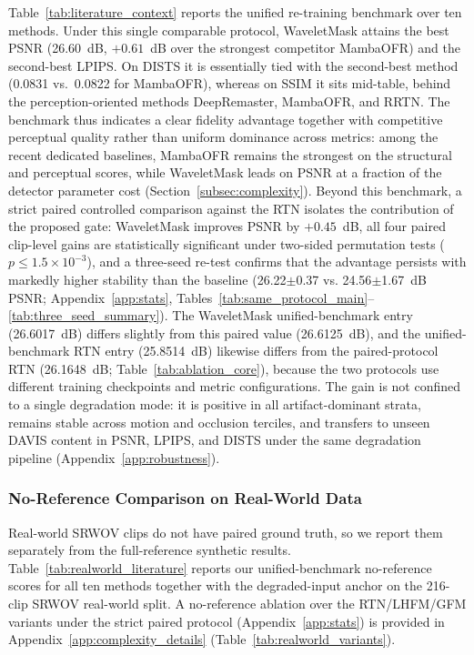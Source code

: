 \documentclass[applsci,article,submit,pdftex,moreauthors]{Definitions/mdpi}
\begin{document}
Table~\ref{tab:literature_context} reports the unified re-training benchmark over ten methods. Under this single comparable protocol, WaveletMask attains the best PSNR (26.60~dB, $+0.61$~dB over the strongest competitor MambaOFR) and the second-best LPIPS. On DISTS it is essentially tied with the second-best method (0.0831 vs.\ 0.0822 for MambaOFR), whereas on SSIM it sits mid-table, behind the perception-oriented methods DeepRemaster, MambaOFR, and RRTN. The benchmark thus indicates a clear fidelity advantage together with competitive perceptual quality rather than uniform dominance across metrics: among the recent dedicated baselines, MambaOFR remains the strongest on the structural and perceptual scores, while WaveletMask leads on PSNR at a fraction of the detector parameter cost (Section~\ref{subsec:complexity}). Beyond this benchmark, a strict paired controlled comparison against the RTN isolates the contribution of the proposed gate: WaveletMask improves PSNR by $+0.45$~dB, all four paired clip-level gains are statistically significant under two-sided permutation tests ($p\le1.5\times10^{-3}$), and a three-seed re-test confirms that the advantage persists with markedly higher stability than the baseline (26.22$\pm$0.37 vs. 24.56$\pm$1.67~dB PSNR; Appendix~\ref{app:stats}, Tables~\ref{tab:same_protocol_main}--\ref{tab:three_seed_summary}). The WaveletMask unified-benchmark entry (26.6017~dB) differs slightly from this paired value (26.6125~dB), and the unified-benchmark RTN entry (25.8514~dB) likewise differs from the paired-protocol RTN (26.1648~dB; Table~\ref{tab:ablation_core}), because the two protocols use different training checkpoints and metric configurations. The gain is not confined to a single degradation mode: it is positive in all artifact-dominant strata, remains stable across motion and occlusion terciles, and transfers to unseen DAVIS content in PSNR, LPIPS, and DISTS under the same degradation pipeline (Appendix~\ref{app:robustness}).

\subsubsection{No-Reference Comparison on Real-World Data}\label{subsec:realworld}

Real-world SRWOV clips do not have paired ground truth, so we report them separately from the full-reference synthetic results. Table~\ref{tab:realworld_literature} reports our unified-benchmark no-reference scores for all ten methods together with the degraded-input anchor on the 216-clip SRWOV real-world split. A no-reference ablation over the RTN/LHFM/GFM variants under the strict paired protocol (Appendix~\ref{app:stats}) is provided in Appendix~\ref{app:complexity_details} (Table~\ref{tab:realworld_variants}).
\end{document}
